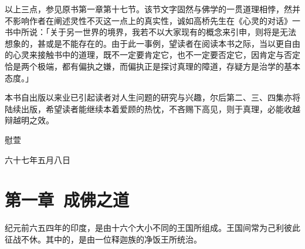 \documentclass[twoside,openany]{book}
\begin{document}
以上三点，参见原书第一章第十七节。该节文字固然与佛学的一贯道理相悖，然并不影响作者在阐述灵性不灭这一点上的真实性，诚如高桥先生在《心灵的对话》一书中所说：「关于另一世界的境界，我若不以大家现有的概念来引申，则将是无法想象的，甚或是不能存在的。由于此一事例，望读者在阅读本书之际，当以更自由的心灵来接触书中的道理，既不一定要肯定它，也不一定要否定它，因肯定与否定恰是两个极端，都有偏执之嫌，而偏执正是探讨真理的障道，存疑方是治学的基本态度。」

本书自出版以来业已引起读者对人生问题的研究与兴趣，尔后第二、三、四集亦将陆续出版，希望读者能继续本着爱顾的热忱，不吝赐下高见，则于真理，必能收越辩越明之效。

\begin{flushright}
慰萱\hspace{1.5cm}

六十七年五月八日	
\end{flushright}






%
%
%
%
%
%
%
%
%
%
%
%
%
%
%
%
%
%
%
%
%
%
%
%
%
%
%
%
%
%
%
%
%
%
%
%
%
%
%
%
%
%
%
%
%
%
%
%







\chapter{第一章\ 成佛之道}\label{ch1}
纪元前六五四年的印度，是由十六个大小不同的王国所组成。王国间常为己利彼此征战不休。其中的，是由一位释迦族的净饭王所统治。
\end{document}

